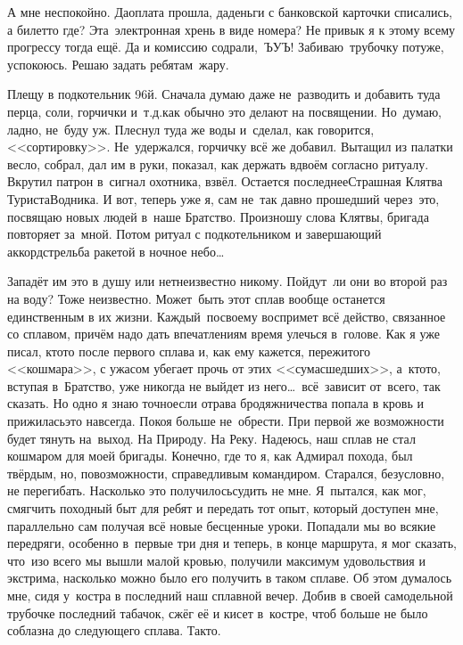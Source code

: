 А мне неспокойно. Да\mdash оплата прошла, да\mdash деньги с банковской карточки списались, а билет\sdash то где? Эта~электронная хрень в виде номера? Не привык я к этому всему прогрессу тогда ещё. Да и комиссию содрали,~ЪУЪ! Забиваю~трубочку потуже, успокоюсь. Решаю задать ребятам~жару.

Плещу в подкотельник 96\sdash й. Сначала думаю даже не~разводить и добавить туда перца, соли, горчички и~т.д.\mdash как обычно это делают на посвящении. Но~думаю, ладно, не~буду уж. Плеснул туда же воды и~сделал, как говорится, <<сортировку>>. Не~удержался, горчичку всё же добавил. Вытащил из палатки весло, собрал, дал им в руки, показал, как держать вдвоём согласно ритуалу. Вкрутил патрон в~сигнал охотника, взвёл. Остается последнее\mdash Страшная Клятва Туриста\sdash Водника. И вот, теперь уже я, сам не~так давно прошедший через~это, посвящаю новых людей в~наше Братство. Произношу слова Клятвы, бригада повторяет за~мной. Потом ритуал с подкотельником и завершающий аккорд\mdash стрельба ракетой в ночное небо\ldots~   

Западёт им это в душу или нет\mdash неизвестно никому. Пойдут~ли они во второй раз на воду? Тоже неизвестно. Может~быть этот сплав вообще останется единственным в их жизни. Каждый~по\sdash своему воспримет всё действо, связанное со сплавом, причём надо дать впечатлениям время улечься в~голове. Как я уже писал, кто\sdash то после первого сплава и, как ему кажется, пережитого <<кошмара>>, с ужасом убегает прочь от этих <<сумасшедших>>, а~кто\sdash то, вступая в~Братство, уже никогда не выйдет из него\ldots~всё~зависит от~всего, так сказать. Но одно я знаю точно\mdash если отрава бродяжничества попала в кровь и прижилась\mdash это навсегда. Покоя больше не~обрести. При первой же возможности будет тянуть на~выход. На Природу. На Реку.
\newpage
Надеюсь, наш сплав не стал кошмаром для моей бригады. Конечно, где то я, как Адмирал похода, был твёрдым, но, по\sdash возможности, справедливым командиром. Старался, безусловно, не перегибать. Насколько это получилось\mdash судить не мне. Я~пытался, как мог, смягчить походный быт для ребят и передать тот опыт, который доступен мне, параллельно сам получая всё новые бесценные уроки. Попадали мы во всякие передряги, особенно в~первые три дня и теперь, в конце маршрута, я мог сказать, что~изо всего мы вышли малой кровью, получили максимум удовольствия и экстрима, насколько можно было его получить в таком сплаве. Об этом думалось мне, сидя у~костра в последний наш сплавной вечер. Добив в своей самодельной трубочке последний табачок, сжёг её и кисет в~костре, чтоб больше не было соблазна до следующего сплава. Так\sdash то. 

\begin{center}
\end{center}